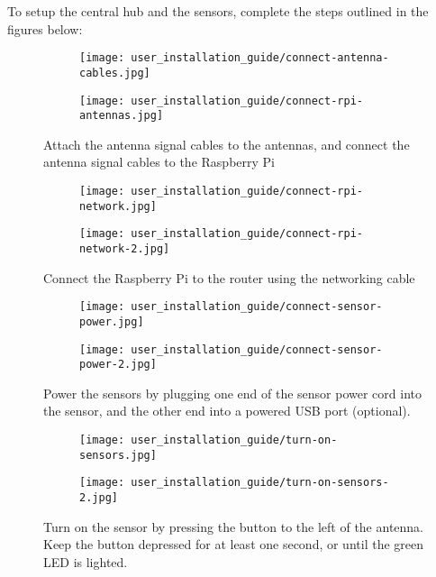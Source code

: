 \documentclass[../document.tex]{subfiles}
\begin{document}
To setup the central hub and the sensors, complete the steps outlined in the figures below:
\begin{figure}[H]
	\centering
	\begin{subfigure}[h]{0.48\textwidth}
		\texttt{[image: user\_installation\_guide/connect-antenna-cables.jpg]}
	\end{subfigure}
	\quad
	\begin{subfigure}[h]{0.48\textwidth}
		\texttt{[image: user\_installation\_guide/connect-rpi-antennas.jpg]}
	\end{subfigure}
	\caption{Attach the antenna signal cables to the antennas, and connect the antenna signal cables to the \gls{Raspberry Pi}}
\end{figure}

\begin{figure}[H]
	\centering
	\begin{subfigure}[h]{0.48\textwidth}
		\texttt{[image: user\_installation\_guide/connect-rpi-network.jpg]}
	\end{subfigure}
	\quad
	\begin{subfigure}[h]{0.48\textwidth}
		\texttt{[image: user\_installation\_guide/connect-rpi-network-2.jpg]}
	\end{subfigure}
	\caption{Connect the \gls{Raspberry Pi} to the router using the networking cable}
\end{figure}

\begin{figure}[H]
	\centering
	\begin{subfigure}[h]{0.48\textwidth}
		\texttt{[image: user\_installation\_guide/connect-sensor-power.jpg]}
	\end{subfigure}
	\quad
	\begin{subfigure}[h]{0.48\textwidth}
		\texttt{[image: user\_installation\_guide/connect-sensor-power-2.jpg]}
	\end{subfigure}
	\caption{Power the sensors by plugging one end of the sensor power cord into the sensor, and the other end into a powered USB port (optional).}
\end{figure}

\begin{figure}[H]
	\centering
	\begin{subfigure}[h]{0.48\textwidth}
		\texttt{[image: user\_installation\_guide/turn-on-sensors.jpg]}
	\end{subfigure}
	\quad
	\begin{subfigure}[h]{0.48\textwidth}
		\texttt{[image: user\_installation\_guide/turn-on-sensors-2.jpg]}
	\end{subfigure}
	\caption{Turn on the sensor by pressing the button to the left of the antenna. Keep the button depressed for at least one second, or until the green LED is lighted.}
\end{figure}
\end{document}
